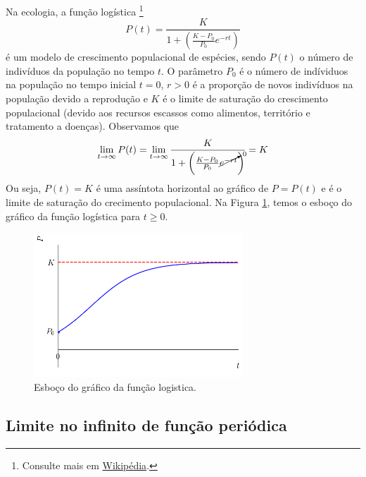 \begin{ex}
  Na ecologia, a função logística \footnote{Consulte mais em \href{https://pt.wikipedia.org/wiki/Fun\%C3\%A7\%C3\%A3o_log\%C3\%ADstica}{Wikipédia}.}
    \begin{equation}
      P(t) = \frac{K}{1 + \left(\frac{K-P_0}{P_0}e^{-rt}\right)}
    \end{equation}
    é um modelo de crescimento populacional de espécies, sendo $P(t)$ o número de indivíduos da população no tempo $t$. O parâmetro $P_0$ é o número de indíviduos na população no tempo inicial $t=0$, $r>0$ é a proporção de novos indivíduos na população devido a reprodução e $K$ é o limite de saturação do crescimento populacional (devido aos recursos escassos como alimentos, território e tratamento a doenças). Observamos que
    \begin{equation}
      \lim_{t\to\infty} P(t) = \lim_{t\to\infty} \frac{K}{1 + \left(\frac{K-P_0}{P_0}\cancelto{0}{e^{-rt}}\right)} = K
    \end{equation}
    Ou seja, $P(t) = K$ é uma assíntota horizontal ao gráfico de $P = P(t)$ e é o limite de saturação do crecimento populacional. Na Figura \ref{fig:liminf_ex_funlogic}, temos o esboço do gráfico da função logística para $t\geq 0$.

    \begin{figure}[H]
      \centering
      \includegraphics[width=0.7\textwidth]{./cap_lim/dados/fig_liminf_ex_funlogic/fig_liminf_ex_funlogic}
      \caption{Esboço do gráfico da função logistica.}
      \label{fig:liminf_ex_funlogic}
    \end{figure}
\end{ex}

\subsection{Limite no infinito de função periódica}

